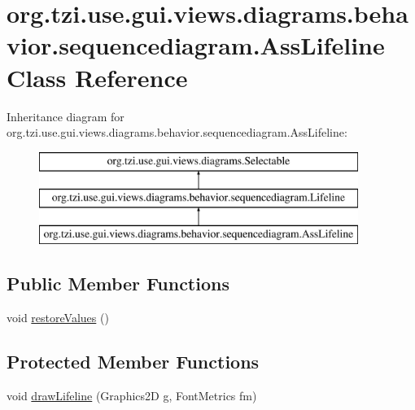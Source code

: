 \hypertarget{classorg_1_1tzi_1_1use_1_1gui_1_1views_1_1diagrams_1_1behavior_1_1sequencediagram_1_1_ass_lifeline}{\section{org.\-tzi.\-use.\-gui.\-views.\-diagrams.\-behavior.\-sequencediagram.\-Ass\-Lifeline Class Reference}
\label{classorg_1_1tzi_1_1use_1_1gui_1_1views_1_1diagrams_1_1behavior_1_1sequencediagram_1_1_ass_lifeline}
}
Inheritance diagram for org.\-tzi.\-use.\-gui.\-views.\-diagrams.\-behavior.\-sequencediagram.\-Ass\-Lifeline\-:\begin{figure}[H]
\begin{center}
\leavevmode
\includegraphics[height=3.000000cm]{classorg_1_1tzi_1_1use_1_1gui_1_1views_1_1diagrams_1_1behavior_1_1sequencediagram_1_1_ass_lifeline}
\end{center}
\end{figure}
\subsection*{Public Member Functions}
\begin{DoxyCompactItemize}
\item 
void \hyperlink{classorg_1_1tzi_1_1use_1_1gui_1_1views_1_1diagrams_1_1behavior_1_1sequencediagram_1_1_ass_lifeline_adbc114acb3fe0304be1a76b68a917dec}{restore\-Values} ()
\end{DoxyCompactItemize}
\subsection*{Protected Member Functions}
\begin{DoxyCompactItemize}
\item 
void \hyperlink{classorg_1_1tzi_1_1use_1_1gui_1_1views_1_1diagrams_1_1behavior_1_1sequencediagram_1_1_ass_lifeline_a306f7c13ecc79ff3afe70de636d2f105}{draw\-Lifeline} (Graphics2\-D g, Font\-Metrics fm)
\end{DoxyCompactItemize}
